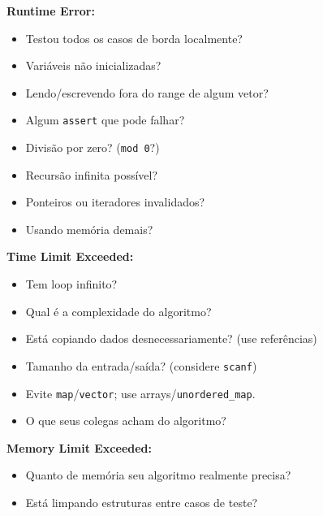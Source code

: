 \textbf{Runtime Error:}
{\fontsize{6.5}{8}\selectfont
\begin{itemize}[noitemsep,topsep=2pt,leftmargin=*]
\item Testou todos os casos de borda localmente?
\item Variáveis não inicializadas?
\item Lendo/escrevendo fora do range de algum vetor?
\item Algum \texttt{assert} que pode falhar?
\item Divisão por zero? (\texttt{mod 0}?)
\item Recursão infinita possível?
\item Ponteiros ou iteradores invalidados?
\item Usando memória demais?
\end{itemize}
}

\textbf{Time Limit Exceeded:}
{\fontsize{6.5}{8}\selectfont
\begin{itemize}[noitemsep,topsep=2pt,leftmargin=*]
\item Tem loop infinito?
\item Qual é a complexidade do algoritmo?
\item Está copiando dados desnecessariamente? (use referências)
\item Tamanho da entrada/saída? (considere \texttt{scanf})
\item Evite \texttt{map}/\texttt{vector}; use arrays/\texttt{unordered\_map}.
\item O que seus colegas acham do algoritmo?
\end{itemize}
}

\textbf{Memory Limit Exceeded:}
{\fontsize{6.5}{8}\selectfont
\begin{itemize}[noitemsep,topsep=2pt,leftmargin=*]
\item Quanto de memória seu algoritmo realmente precisa?
\item Está limpando estruturas entre casos de teste?
\end{itemize}
}
